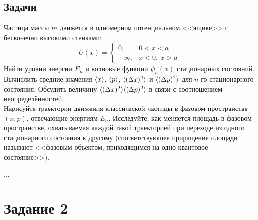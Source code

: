 \subsection*{\hfil Задачи \hfil}

\begin{problem}
\item\label{p:1_1_1}%
Частица массы $m$ движется в одномерном потенциальном <<ящике>> с бесконечно высокими стенками:
$$
U(x) = \begin{cases}
0, & 0 < x < a\\
+\infty, & x < 0,~ x > a
\end{cases}
$$%
%
Найти уровни энергии $E_n$ и волновые функции $\psi_n(x)$ стационарных состояний. Вычислить средние значения $\langle{x}\rangle$, $\langle{p}\rangle$, $\langle{(\Delta x)^2}\rangle$ и $\langle{(\Delta p)^2}\rangle$ для $n$-го стационарного состояния. Обсудить величину $\langle{(\Delta x)^2}\rangle\langle{(\Delta p)^2}\rangle$ в связи с соотношением неопределённостей.\\
Нарисуйте траектории движения классической частицы в фазовом пространстве $(x, p)$, отвечающие энергиям $E_n$. Исследуйте, как меняется площадь в фазовом пространстве, охватываемая каждой такой траекторией при переходе из одного стационарного состояния к другому (соответствующее приращение площади называют <<фазовым объектом, приходящимся на одно квантовое состояние>>).
%
\item ...
\end{problem}


\section{Задание 2}

